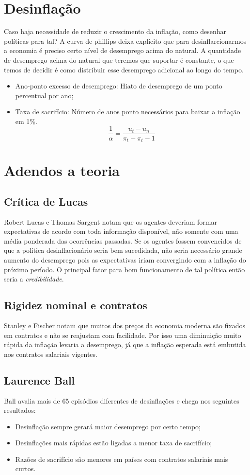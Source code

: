 \documentclass[12pt,a4paper,oneside,brazil]{abntex2}
\begin{document}
\section{Desinflação}
Caso haja necessidade de reduzir o crescimento da inflação, como desenhar políticas para tal? A curva de phillips deixa explícito que para desinflarcionarmos a economia é preciso certo nível de desemprego acima do natural.  A quantidade de desemprego acima do natural que teremos que suportar é constante, o que temos de decidir é como distribuir esse desemprego adicional ao longo do tempo.
\begin{itemize}
\item Ano-ponto excesso de desemprego: Hiato de desemprego de um ponto percentual por ano;
\item Taxa de sacrifício: Número de anos ponto necessários para baixar a inflação em 1\%.
\[ \frac{1}{\alpha} = \frac{u_t - u_n}{\pi_t - \pi_t-1}\]
\end{itemize}

\section{Adendos a teoria}
\subsection{Crítica de Lucas}
Robert Lucas e Thomas Sargent notam que os agentes deveriam formar expectativas de acordo com toda informação disponível, não somente com uma média ponderada das ocorrências passadas. Se os agentes fossem convencidos de que a política desinflacionário seria bem sucedidada, não seria necessário grande aumento do desemprego pois as expectativas iriam convergindo com a inflação do próximo período. O principal fator para bom funcionamento de tal política então seria a \emph{credibilidade}.
\subsection{Rigidez nominal e contratos}
Stanley e Fischer notam que muitos dos preços da economia moderna são fixados em contratos e não se reajustam com facilidade. Por isso uma diminuição muito rápida da inflação levaria a desemprego, já que a inflação esperada está embutida nos contratos salariais vigentes.
\subsection{Laurence Ball}
Ball avalia mais de 65 episódios diferentes de desinflações e chega nos seguintes resultados:
\begin{itemize}
\item Desinflação sempre gerará maior desemprego por certo tempo;
\item Desinflações mais rápidas estão ligadas a menor taxa de sacrifício;
\item Razões de sacrifício são menores em países com contratos salariais mais curtos.
\end{itemize}
\end{document}
